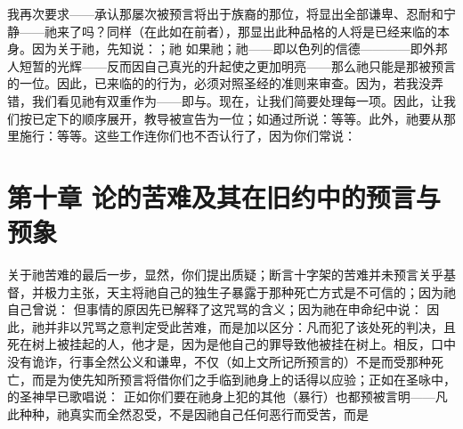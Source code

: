 我再次要求——承认那屡次被预言将出于族裔的那位，将显出全部谦卑、忍耐和宁静——祂来了吗？同样（在此如在前者），那显出此种品格的人将是已经来临的本身。因为关于祂，先知说：；祂 如果祂；祂——即以色列的信德————即外邦人短暂的光辉——反而因自己真光的升起使之更加明亮——那么祂只能是那被预言的一位。因此，已来临的的行为，必须对照圣经的准则来审查。因为，若我没弄错，我们看见祂有双重作为——即与。现在，让我们简要处理每一项。因此，让我们按已定下的顺序展开，教导被宣告为一位；如通过所说：等等。此外，祂要从那里施行：等等。这些工作连你们也不否认行了，因为你们常说：\par


\section{第十章 论的苦难及其在旧约中的预言与预象}

关于祂苦难的最后一步，显然，你们提出质疑；断言十字架的苦难并未预言关乎基督，并极力主张，天主将祂自己的独生子暴露于那种死亡方式是不可信的；因为祂自己曾说： 但事情的原因先已解释了这咒骂的含义；因为祂在申命纪中说： 因此，祂并非以咒骂之意判定受此苦难，而是加以区分：凡而犯了该处死的判决，且死在树上被挂起的人，他才是，因为是他自己的罪导致他被挂在树上。相反，口中没有诡诈，行事全然公义和谦卑，不仅（如上文所记所预言的）不是而受那种死亡，而是为使先知所预言将借你们之手临到祂身上的话得以应验；正如在圣咏中，的圣神早已歌唱说：     正如你们要在祂身上犯的其他（暴行）也都预被言明——凡此种种，祂真实而全然忍受，不是因祂自己任何恶行而受苦，而是\par

